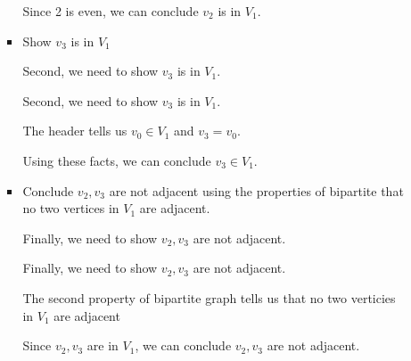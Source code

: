\documentclass[12pt]{article}
\begin{document}
\begin{enumerate}[a.]
\begin{mdframed}
\begin{enumerate}[1.]
\begin{itemize}
\begin{mdframed}
                \bigskip

                Since 2 is even, we can conclude $v_2$ is in $V_1$.
                \end{mdframed}

                \item Show $v_3$ is in $V_1$

                \bigskip

                Second, we need to show $v_3$ is in $V_1$.

                \bigskip

                \begin{mdframed}
                Second, we need to show $v_3$ is in $V_1$.

                \bigskip

                The header tells us $v_0 \in V_1$ and $v_3 = v_0$.

                \bigskip

                Using these facts, we can conclude $v_3 \in V_1$.

                \end{mdframed}

                \item Conclude $v_2,v_3$ are not adjacent using the properties of bipartite
                that no two vertices in $V_1$ are adjacent.

                \bigskip

                Finally, we need to show $v_2, v_3$ are not adjacent.

                \bigskip

                \begin{mdframed}
                Finally, we need to show $v_2, v_3$ are not adjacent.

                \bigskip

                The second property of bipartite graph tells us that no two
                verticies in $V_1$ are adjacent

                \bigskip

                Since $v_2,v_3$ are in $V_1$, we can conclude $v_2,v_3$ are not
                adjacent.
                \end{mdframed}

            \end{itemize}

            \begin{mdframed}


\end{mdframed}
\end{enumerate}
\end{mdframed}
\end{enumerate}
\end{document}
